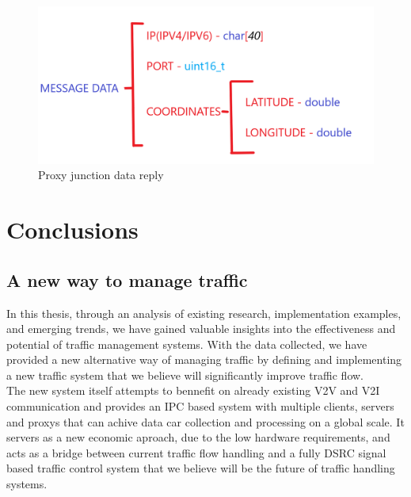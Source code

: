 \documentclass[17pt]{report}
\begin{document}
\begin{figure}[h!]
    \includegraphics[width=\textwidth]{Sketches/ProxyJunctionMessage.png}
    \caption{Proxy junction data reply}
    \label{fig:Proxy junction data reply}
\end{figure}


\chapter{Conclusions}
\section{A new way to manage traffic}
\indent \indent
In this thesis, through an analysis of existing research,
implementation examples, and emerging trends, we have gained valuable
insights into the effectiveness and potential of traffic management
systems. With the data collected, we have provided a new alternative 
way of managing traffic by defining and implementing a new traffic 
system that we believe will significantly improve traffic flow. \\
\indent
The new system itself attempts to bennefit on already existing V2V and V2I
communication and provides an IPC based system with multiple clients, servers
and proxys that can achive data car collection and processing on a global scale.
It servers as a new economic aproach, due to the low hardware requirements,
and acts as a bridge between current traffic flow handling and a fully 
DSRC signal based traffic control system that we believe will be the 
future of traffic handling systems.
\end{document}
